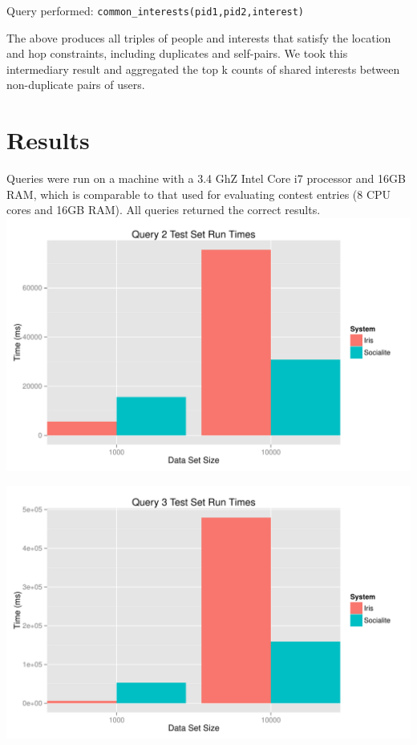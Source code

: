 \documentclass{article}
\begin{document}
\begin{multicols}{2}


Query performed: \texttt{common\_interests(pid1,pid2,interest)}

The above produces all triples of people and interests that satisfy the location and hop constraints, including duplicates and self-pairs. We took this intermediary result and aggregated the top k counts of shared interests between non-duplicate pairs of users.																																												
\section{Results}
Queries were run on a machine with a 3.4 GhZ Intel Core i7 processor and 16GB RAM, which is comparable to that used for evaluating contest entries (8 CPU cores and 16GB RAM). All queries returned the correct results.
\begingroup
    \centering
    \includegraphics[scale=0.4]{../results/query2.pdf}
    \label{fig:q2}
\endgroup

\begingroup
    \centering
    \includegraphics[scale=0.4]{../results/query3.pdf}
    \label{fig:q3}
\endgroup


\end{multicols}
\end{document}
